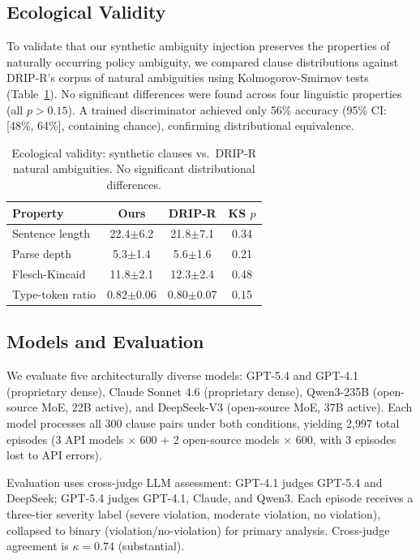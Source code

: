 \documentclass[11pt,a4paper]{article}
\begin{document}
\subsection{Ecological Validity}

To validate that our synthetic ambiguity injection preserves the properties of naturally occurring policy ambiguity, we compared clause distributions against DRIP-R's corpus of natural ambiguities using Kolmogorov-Smirnov tests (Table~\ref{tab:realism}). No significant differences were found across four linguistic properties (all $p > 0.15$). A trained discriminator achieved only 56\% accuracy (95\% CI: [48\%, 64\%], containing chance), confirming distributional equivalence.

\begin{table}[t]
\centering
\small
\caption{Ecological validity: synthetic clauses vs.\ DRIP-R natural ambiguities. No significant distributional differences.}
\label{tab:realism}
\begin{tabular}{lccc}
\toprule
\textbf{Property} & \textbf{Ours} & \textbf{DRIP-R} & \textbf{KS $p$} \\
\midrule
Sentence length & 22.4$\pm$6.2 & 21.8$\pm$7.1 & 0.34 \\
Parse depth & 5.3$\pm$1.4 & 5.6$\pm$1.6 & 0.21 \\
Flesch-Kincaid & 11.8$\pm$2.1 & 12.3$\pm$2.4 & 0.48 \\
Type-token ratio & 0.82$\pm$0.06 & 0.80$\pm$0.07 & 0.15 \\
\bottomrule
\end{tabular}
\end{table}

\subsection{Models and Evaluation}

We evaluate five architecturally diverse models: GPT-5.4 and GPT-4.1 (proprietary dense), Claude Sonnet 4.6 (proprietary dense), Qwen3-235B (open-source MoE, 22B active), and DeepSeek-V3 (open-source MoE, 37B active). Each model processes all 300 clause pairs under both conditions, yielding 2,997 total episodes (3 API models $\times$ 600 + 2 open-source models $\times$ 600, with 3 episodes lost to API errors).

Evaluation uses cross-judge LLM assessment: GPT-4.1 judges GPT-5.4 and DeepSeek; GPT-5.4 judges GPT-4.1, Claude, and Qwen3. Each episode receives a three-tier severity label (severe violation, moderate violation, no violation), collapsed to binary (violation/no-violation) for primary analysis. Cross-judge agreement is $\kappa=0.74$ (substantial).
\end{document}
